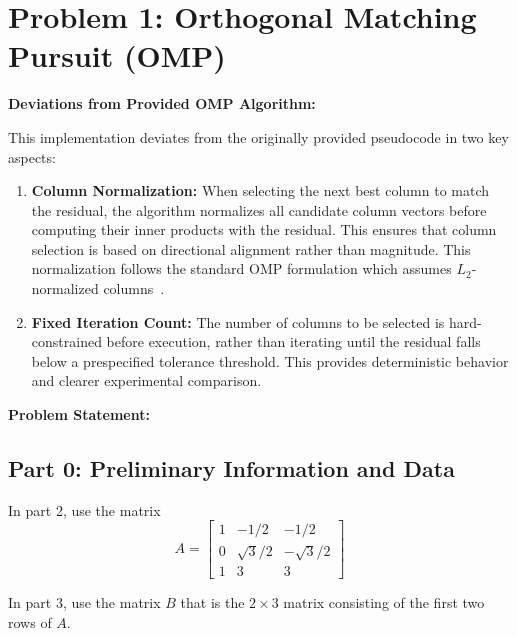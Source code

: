 \clearpage
\section*{Problem 1: Orthogonal Matching Pursuit (OMP)}

\begin{tcolorbox}[colback=white, colframe=black, title=Implementation Notes]
\textbf{Deviations from Provided OMP Algorithm:}

This implementation deviates from the originally provided pseudocode in two key aspects:
\begin{enumerate}[label=(\roman*)]
    \item \textbf{Column Normalization:} When selecting the next best column to match the residual, the algorithm normalizes all candidate column vectors before computing their inner products with the residual. This ensures that column selection is based on directional alignment rather than magnitude. This normalization follows the standard OMP formulation which assumes $L_2$-normalized columns~\cite{Cai2011Jun}.
    
    \item \textbf{Fixed Iteration Count:} The number of columns to be selected is hard-constrained before execution, rather than iterating until the residual falls below a prespecified tolerance threshold. This provides deterministic behavior and clearer experimental comparison.
\end{enumerate}
\end{tcolorbox}

\vspace{1em}

\textbf{Problem Statement:} 

\subsection*{Part 0: Preliminary Information and Data}

In part 2, use the matrix
$$A = \begin{bmatrix} 
1 & -1/2 & -1/2 \\
0 & \sqrt{3}/2 & -\sqrt{3}/2 \\
1 & 3 & 3
\end{bmatrix}$$

In part 3, use the matrix $B$ that is the $2 \times 3$ matrix consisting of the first two rows of $A$.

